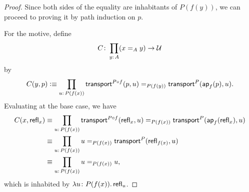 \begin{proof}
    Since both sides of the equality are inhabitants of $P(f(y))$, we can proceed to proving it by path induction on $p$.
    
    For the motive, define
    \[
        C\colon \prod_{y\colon A} (x\eq A y)\to \univ
    \]
    by
    \[
        C(y,p) \defeq
            \prod_{u\colon P(f(x))}
                \fun{transport}^{P\circ f}(p,u) \eq{P(f(y))}
                    \fun{transport}^P(\fun{ap}_f(p),u).
    \]
    Evaluating at the base case, we have
    \begin{align*}
        C(x,\fun{refl}_x)
            &\equiv \prod_{u\colon P(f(x))}
                \fun{transport}^{P\circ f}(\fun{refl}_x,u)
                    \eq{P(f(x))}
                    \fun{transport}^P(\fun{ap}_f(\fun{refl}_x),u) \\
            &\equiv \prod_{u\colon P(f(x))}
                u \eq{P(f(x))}
                    \fun{transport}^P(\fun{refl}_{f(x)},u) \\
            &\equiv \prod_{u\colon P(f(x))}
                u \eq{P(f(x))} u,
    \end{align*}
    which is inhabited by $\lambda u\colon P(f(x)).\,\fun{refl}_u$.
\end{proof}

